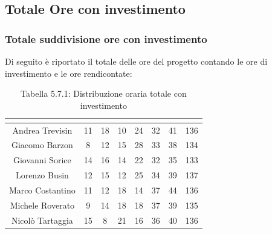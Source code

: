 \subsection{Totale Ore con investimento}

\subsubsection{Totale suddivisione ore con investimento}
Di seguito è riportato il totale delle ore del progetto contando le ore di investimento e le ore rendicontate:

\renewcommand{\arraystretch}{1.5}
\begin{table}[H]
\begin{center}
\begin{tabular}{|c|c|c|c|c|c|c|c|}
\hline
\rowcolor{title_row}
\textbf{\color{title_text}{Nome}} & \textbf{\color{title_text}{Resp.}} & \textbf{\color{title_text}{Ammi.}} & \textbf{\color{title_text}{Analist.}} & \textbf{\color{title_text}{Progett.}} & \textbf{\color{title_text}{Program.}} & \textbf{\color{title_text}{Verific.}} & \textbf{\color{title_text}{Totale}} \\ \hline
Andrea Trevisin  & 11 & 18 & 10 & 24 & 32 & 41 & 136 \\ \hline
Giacomo Barzon   & 8 & 12 & 15 & 28 & 33 & 38 & 134 \\ \hline
Giovanni Sorice  & 14 & 16 & 14 & 22 & 32 & 35 & 133 \\ \hline
Lorenzo Busin    & 12 & 15 & 12 & 25 & 34 & 39 & 137 \\ \hline
Marco Costantino & 11 & 12 & 18 & 14 & 37 & 44 & 136 \\ \hline
Michele Roverato & 9 & 14 & 18 & 18 & 37 & 39 & 135 \\ \hline
Nicolò Tartaggia & 15 & 8 & 21 & 16 & 36 & 40 & 136  \\ \hline
\end{tabular}
\caption{Tabella 5.7.1: Distribuzione oraria totale con investimento\label{}}
\end{center}
\end{table}
\renewcommand{\arraystretch}{1}

